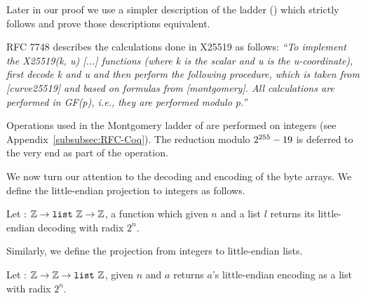 Later in our proof we use a simpler description of the ladder
() which strictly follows 
and prove those descriptions equivalent.

RFC 7748 describes the calculations done in X25519 as follows:
\emph{``To implement the X25519(k, u) [...] functions (where k is
  the scalar and u is the u-coordinate), first decode k and u and then
  perform the following procedure, which is taken from [curve25519] and
  based on formulas from [montgomery].  All calculations are performed
  in GF(p), i.e., they are performed modulo p.''}~\cite{rfc7748}

Operations used in the Montgomery ladder of  are performed on
integers (see Appendix~\ref{subsubsec:RFC-Coq}).
The reduction modulo $2^{255}-19$ is deferred to the very end as part of the
 operation.

We now turn our attention to the decoding and encoding of the byte arrays.
We define the little-endian projection to integers as follows.
\begin{dfn}
  Let  : $\mathbb{Z} \rightarrow \texttt{list}~\mathbb{Z} \rightarrow \mathbb{Z}$,
  a function which given $n$ and a list $l$ returns its little-endian decoding with radix $2^n$.
\end{dfn}
Similarly, we define the projection from integers to little-endian lists.
\begin{dfn}
  Let  : $\mathbb{Z} \rightarrow \mathbb{Z} \rightarrow \texttt{list}~\mathbb{Z}$, given
  $n$ and $a$ returns $a$'s little-endian encoding as a list with radix $2^n$.
\end{dfn}


